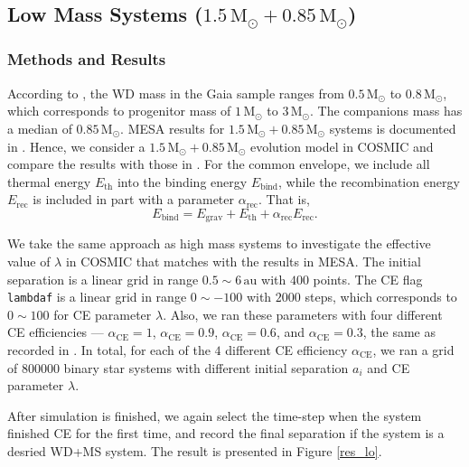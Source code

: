 \documentclass[12pt]{article}
\newcommand{\Msun}{\,\mathrm{M_{\odot}}}
\newcommand{\alphace}{\alpha_{\mathrm{CE}}}
\newcommand{\alpharec}{\alpha_{\mathrm{rec}}}
\newcommand{\Ebind}{E_{\mathrm{bind}}}
\newcommand{\Egrav}{E_{\mathrm{grav}}}
\newcommand{\Eth}{E_{\mathrm{th}}}
\newcommand{\Erec}{E_{\mathrm{rec}}}
\newcommand{\au}{\, \mathrm{au}}
\begin{document}
\subsection{Low Mass Systems ($1.5 \Msun + 0.85 \Msun$)} \label{subsec:low}

\subsubsection{Methods and Results}
According to \cite{yamaguchi_lo}, the WD mass in the Gaia sample ranges from $0.5\Msun$ to $0.8\Msun$, which corresponds to progenitor mass of $1 \Msun$ to $3 \Msun$. The companions mass has a median of $0.85 \Msun$. MESA results for $1.5\Msun + 0.85\Msun$ systems is documented in \cite{yamaguchi_hi}. Hence, we consider a $1.5\Msun + 0.85\Msun$ evolution model in COSMIC and compare the results with those in \cite{yamaguchi_hi}. For the common envelope, we include all thermal energy $\Eth$ into the binding energy $\Ebind$, while the recombination energy $\Erec$ is included in part with a parameter $\alpharec$. That is,
\[
  \Ebind = \Egrav + \Eth + \alpharec \Erec.
\]

We take the same approach as high mass systems to investigate the effective value of $\lambda$ in COSMIC that matches with the results in MESA. The initial separation is a linear grid in range $0.5 \sim 6 \au$ with $400$ points. The CE flag \verb|lambdaf| is a linear grid in range $0 \sim -100$ with $2000$ steps, which corresponds to $0 \sim 100$ for CE parameter $\lambda$. Also, we ran these parameters with four different CE efficiencies — $\alphace = 1$, $\alphace = 0.9$, $\alphace = 0.6$, and $\alphace = 0.3$, the same as recorded in \cite{yamaguchi_lo}. In total, for each of the $4$ different CE efficiency $\alphace$, we ran a grid of $800000$ binary star systems with different initial separation $a_i$ and CE parameter $\lambda$.

After simulation is finished, we again select the time-step when the system finished CE for the first time, and record the final separation if the system is a desried WD+MS system. The result is presented in Figure \ref{res_lo}.
\end{document}
